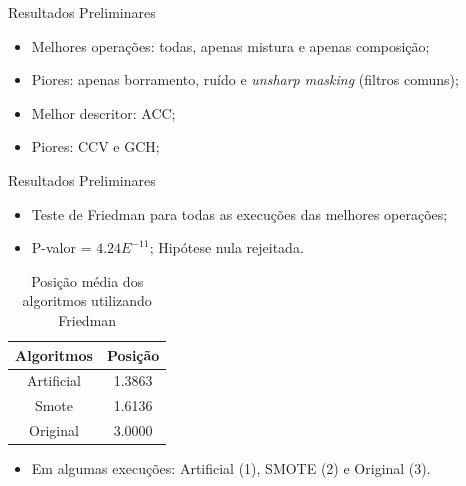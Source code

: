 \documentclass{beamer}
\begin{document}
\begin{frame}{Resultados Preliminares}
\setlength\leftmargini{0em}
\justifying
\begin{itemize}
\item Melhores operações: todas, apenas mistura e apenas composição;
\item Piores: apenas borramento, ruído e \textit{unsharp masking} (filtros comuns);
\vspace{2pt}
\item Melhor descritor: ACC;
\item Piores: CCV e GCH;
\end{itemize}
\end{frame}
\begin{frame}{Resultados Preliminares}
\setlength\leftmargini{0em}
\justifying
\begin{itemize}
\item Teste de Friedman para todas as execuções das melhores operações;
\item P-valor = $4.24E^{-11}$; Hipótese nula rejeitada.
\end{itemize}
\begin{table}[htb]
\centering
\caption{Posição média dos algoritmos utilizando Friedman}
  \begin{tabular}{c|c}
    Algoritmos  &   Posição \\ \hline
    Artificial  &   1.3863  \\
    Smote       &   1.6136  \\
    Original    &   3.0000  \\
  \end{tabular}
\end{table}
\begin{itemize}
\item Em algumas execuções: Artificial (1), SMOTE (2) e Original (3).
\end{itemize}
\end{frame}
\end{document}
